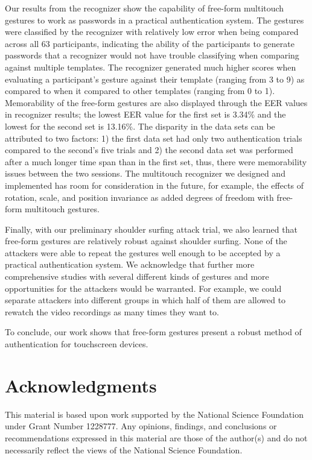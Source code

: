 \documentclass{sig-alternate-10pt}
\begin{document}
Our results from the recognizer show the capability of free-form multitouch gestures to work as passwords in a practical authentication system. The gestures were classified by the recognizer with relatively low error when being compared across all 63 participants,  indicating the ability of the participants to generate passwords that a recognizer would not have trouble classifying when comparing against multiple templates. The recognizer generated much higher scores when evaluating a participant's gesture against their template (ranging from 3 to 9) as compared to when it compared to other templates (ranging from 0 to 1). Memorability of the free-form gestures are also displayed through the EER values in recognizer results;  the lowest EER value for the first set is 3.34\% and the lowest for the second set is 13.16\%. The disparity in the data sets can be attributed to two factors: 1) the first data set had only two authentication trials compared to the second's five trials and 2) the second data set was performed after a much longer time span than in the first set, thus, there were memorability issues between the two sessions. The multitouch recognizer we designed and implemented has room for consideration in the future, for example, the effects of rotation, scale, and position invariance as added degrees of freedom with free-form multitouch gestures. 

Finally, with our preliminary shoulder surfing attack trial, we also learned that free-form gestures are relatively robust against shoulder surfing. None of the attackers were able to repeat the gestures well enough to be accepted by a practical authentication system. We acknowledge that further more comprehensive studies with several different kinds of gestures and more opportunities for the attackers would be warranted. For example, we could separate attackers into different groups in which half of them are allowed to rewatch the video recordings as many times they want to.

To conclude, our work shows that free-form gestures present a robust method of authentication for touchscreen devices.

\section*{Acknowledgments}

This material is based upon work supported by the National Science Foundation under Grant Number 1228777. Any opinions, findings, and conclusions or recommendations expressed in this material are those of the author(s) and do not necessarily reflect the views of the National Science Foundation.


\balance



\end{document}
